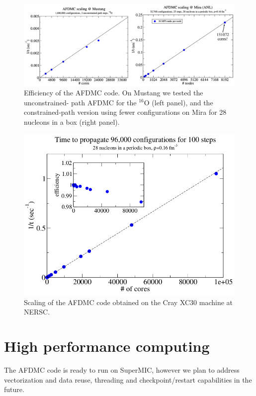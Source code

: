 \documentclass[12pt,letterpaper]{article}
\begin{document}
\begin{figure}[!htb]
\centering
\includegraphics[width=\linewidth]{mustang.png}
\caption{Efficiency of the AFDMC code. On Mustang we tested the unconstrained-
path AFDMC
for the $^{16}$O (left panel), and the constrained-path version using fewer 
configurations on Mira for 28
nucleons in a box (right panel).}
\label{fig:mustang}
\end{figure}	

\begin{figure}[!htb]
\centering
\includegraphics[width=0.5\linewidth]{cray.png}
\caption{Scaling of the AFDMC code obtained on the Cray XC30 machine at NERSC.}
\label{fig:cray}
\end{figure}	

\newpage
\section{High performance computing}

The AFDMC code is ready to run on SuperMIC, however we plan to address 
vectorization and data reuse, threading and checkpoint/restart capabilities in 
the future.
\end{document}
